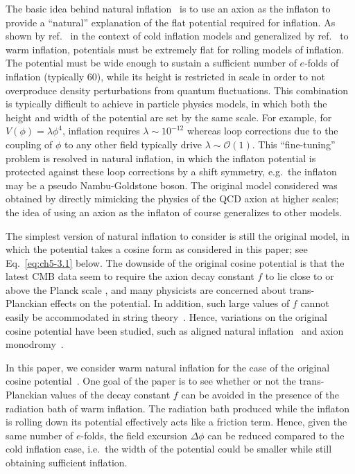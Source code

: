 The basic idea behind natural inflation~\cite{Freese:1990rb} is to use an axion as the inflaton to provide a ``natural'' explanation of the flat potential required for inflation. As shown by ref.~\cite{Adams:1990pn} in the context of cold inflation models and generalized by ref.~\cite{Montefalcone:2022owy} to warm inflation, potentials must be extremely flat for rolling models of inflation. The potential must be wide enough to sustain a sufficient number of $e$-folds of inflation (typically 60), while its height is restricted in scale in order to not overproduce density perturbations from quantum fluctuations. This combination is typically difficult to achieve in particle physics models, in which both the height and width of the potential are set by the same scale. For example, for $V(\phi) = \lambda \phi^4$, inflation requires $\lambda \sim 10^{-12}$ whereas loop corrections due to the coupling of $\phi$ to any other field typically drive $\lambda \sim \mathcal{O}(1)$. This ``fine-tuning'' problem is resolved in natural inflation, in which the inflaton potential is protected against these loop corrections by a shift symmetry, e.g.\ the inflaton may be a pseudo Nambu-Goldstone boson. The original model considered was obtained by directly mimicking the physics of the QCD axion at higher scales; the idea of using an axion as the inflaton of course generalizes to other models.

The simplest version of natural inflation to consider is still the original model, in which the potential takes a cosine form as considered in this paper; see Eq.~\ref{eq:ch5-3.1} below. The downside of the original cosine potential is that the latest CMB data seem to require the axion decay constant $f$ to lie close to or above the Planck scale \cite{Freese:2014nla,Stein:2021uge}, and many physicists are concerned about trans-Planckian effects on the potential. In addition, such large values of $f$ cannot easily be accommodated in string theory~\cite{Banks:2003sx}. Hence, variations on the original cosine potential have been studied, such as aligned natural inflation~\cite{Kim:2004rp} and axion monodromy~\cite{Silverstein:2008sg}.

In this paper, we consider warm natural inflation for the case of the original cosine potential~\cite{Mishra:2011vh, Visinelli:2011jy}. One goal of the paper is to see whether or not the trans-Planckian values of the decay constant $f$ can be avoided in the presence of the radiation bath of warm inflation. The radiation bath produced while the inflaton is rolling down its potential effectively acts like a friction term. Hence, given the same number of $e$-folds,
the field excursion $\Delta \phi$ can be reduced compared to the cold inflation case,
i.e.\ the width of the potential could be smaller while still obtaining sufficient inflation.


